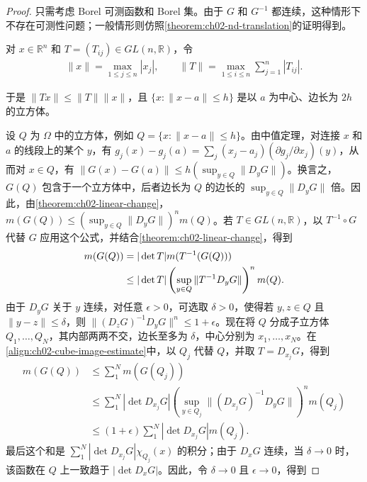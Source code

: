 \documentclass[../../main.tex]{subfiles}%
\begin{document}
\begin{proof}
只需考虑 Borel 可测函数和 Borel 集。由于 $G$ 和 $G^{-1}$ 都连续，这种情形下不存在可测性问题；一般情形则仿照\cref{theorem:ch02-nd-translation}的证明得到。
\begin{definition*}[本证明中的范数记号]
对 $x\in\mathbb{R}^n$ 和 $T=(T_{ij})\in GL(n,\mathbb{R})$，令
\begin{align*}
\|x\|=\max_{1\le j\le n}|x_j|,\qquad
\|T\|=\max_{1\le i\le n}\sum_{j=1}^n|T_{ij}|.
\end{align*}
\end{definition*}
于是 $\|Tx\|\le\|T\|\|x\|$，且 $\{x:\|x-a\|\le h\}$ 是以 $a$ 为中心、边长为 $2h$ 的立方体。

设 $Q$ 为 $\Omega$ 中的立方体，例如 $Q=\{x:\|x-a\|\le h\}$。由中值定理，对连接 $x$ 和 $a$ 的线段上的某个 $y$，有 $g_j(x)-g_j(a)=\sum_j(x_j-a_j)(\partial g_j/\partial x_j)(y)$，从而对 $x\in Q$，有 $\|G(x)-G(a)\|\le h(\sup_{y\in Q}\|D_yG\|)$。换言之，$G(Q)$ 包含于一个立方体中，后者边长为 $Q$ 的边长的 $\sup_{y\in Q}\|D_yG\|$ 倍。因此，由\cref{theorem:ch02-linear-change}，$m(G(Q))\le(\sup_{y\in Q}\|D_yG\|)^n m(Q)$。若 $T\in GL(n,\mathbb{R})$，以 $T^{-1}\circ G$ 代替 $G$ 应用这个公式，并结合\cref{theorem:ch02-linear-change}，得到
\begin{align}\label{align:ch02-cube-image-estimate}
m(G(Q))&=|\det T|m(T^{-1}(G(Q)))\notag\\
&\le|\det T|\left(\sup_{y\in Q}\|T^{-1}D_yG\|\right)^n m(Q).
\end{align}
由于 $D_yG$ 关于 $y$ 连续，对任意 $\epsilon>0$，可选取 $\delta>0$，使得若 $y,z\in Q$ 且 $\|y-z\|\le\delta$，则 $\|(D_zG)^{-1}D_yG\|^n\le1+\epsilon$。现在将 $Q$ 分成子立方体 $Q_1,\ldots,Q_N$，其内部两两不交，边长至多为 $\delta$，中心分别为 $x_1,\ldots,x_N$。在\eqref{align:ch02-cube-image-estimate}中，以 $Q_j$ 代替 $Q$，并取 $T=D_{x_j}G$，得到
\begin{align*}
m(G(Q))&\le\sum_1^N m(G(Q_j))\\
&\le\sum_1^N|\det D_{x_j}G|\left(\sup_{y\in Q_j}\|(D_{x_j}G)^{-1}D_yG\|\right)^n m(Q_j)\\
&\le(1+\epsilon)\sum_1^N|\det D_{x_j}G|m(Q_j).
\end{align*}
最后这个和是 $\sum_1^N|\det D_{x_j}G|\chi_{Q_j}(x)$ 的积分；由于 $D_xG$ 连续，当 $\delta\to0$ 时，该函数在 $Q$ 上一致趋于 $|\det D_xG|$。因此，令 $\delta\to0$ 且 $\epsilon\to0$，得到

\end{proof}
\end{document}
